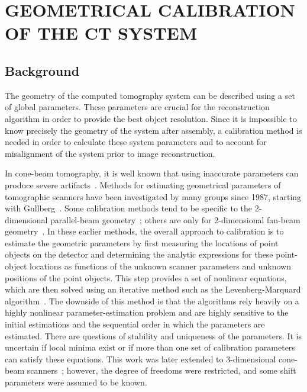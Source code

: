 \chapter{GEOMETRICAL CALIBRATION OF THE CT SYSTEM}
\label{chap:calibration}

\section{Background}
The geometry of the computed tomography system can be described using a set of global parameters.  These parameters are crucial for the reconstruction algorithm in order to provide the best object resolution.  Since it is impossible to know precisely the geometry of the system after assembly, a calibration method is needed in order to calculate these system parameters and to account for misalignment of the system prior to image reconstruction.  

In cone-beam tomography, it is well known that using inaccurate parameters can produce severe artifacts~\citep{Li1994a, Li1994b, Wang1998}. Methods for estimating geometrical parameters of tomographic scanners have been investigated by many groups since 1987, starting with Gullberg~\citep{Gullberg1987}.  Some calibration methods tend to be specific to the 2-dimensional parallel-beam geometry~\citep{Azevedo1990, Busemann1987}; others are only for 2-dimensional fan-beam geometry~\citep{Crawford1988, Hsieh1999, Gullberg1987}.  In these earlier methods, the overall approach to calibration is to estimate the geometric parameters by first measuring the locations of point objects on the detector and determining the analytic expressions for these point-object locations as functions of the unknown scanner parameters and unknown positions of the point objects.  This step provides a set of nonlinear equations, which are then solved using an iterative method such as the Levenberg-Marquard algorithm~\citep{Rougee1993}.  The downside of this method is that the algorithms rely heavily on a highly nonlinear parameter-estimation problem and are highly sensitive to the initial estimations and the sequential order in which the parameters are estimated.  There are questions of stability and uniqueness of the parameters.  It is uncertain if local minima exist or if more than one set of calibration parameters can satisfy these equations.  This work was later extended to 3-dimensional cone-beam scanners~\citep{Gullberg1990}; however, the degree of freedoms were restricted, and some shift parameters were assumed to be known.

